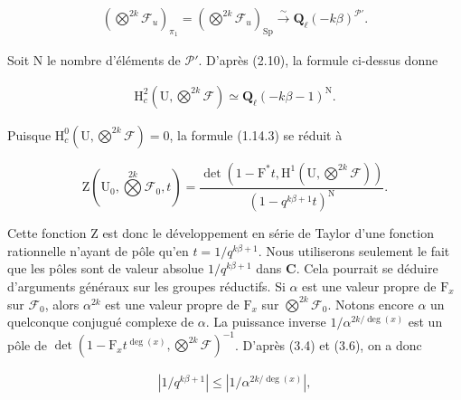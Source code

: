 \documentclass[10pt,leqno]{article}
\begin{document}
\begin{equation*}\begin{gathered}(\bigotimes\limits^{2k}\mathcal{F} _{u})_{\pi _{1}} = (\bigotimes\limits^{2k}\mathcal{F} _{u})_{\operatorname{Sp}} \xrightarrow{\sim } \mathbf{Q}_{\ell }(- k\beta )^{\mathcal{P} '}.\end{gathered}\end{equation*}

\noindent Soit \(\mathrm{N}\) le nombre d’éléments de \(\mathcal{P} '\). D’après (2.10), la formule ci-dessus donne\par

\begin{equation*}\begin{gathered}\mathrm{H}_{c}^{2}(\mathrm{U},\bigotimes\limits^{2k}\mathcal{F} ) \simeq  \mathbf{Q}_{\ell }(- k\beta - 1)^{\mathrm{N}}.\end{gathered}\end{equation*}

\noindent Puisque \(\mathrm{H}_{c}^{0}(\mathrm{U},\bigotimes\limits^{2k}\mathcal{F} )=0\), la formule (1.14.3) se réduit à\par

\[\mathrm{Z}(\mathrm{U}_{0},\bigotimes\limits^{2k}\mathcal{F} _{0},t)=\frac{\operatorname{det}(1- \mathrm{F}^{*}t,\mathrm{H}^{1}(\mathrm{U},\bigotimes\limits^{2k}\mathcal{F} ))}{(1- q^{k\beta +1}t)^{\mathrm{N}}}.\]

\noindent Cette fonction \(\mathrm{Z}\) est donc le développement en série de Taylor d’une fonction rationnelle n’ayant de pôle qu’en \(t=1/q^{k\beta +1}\). Nous utiliserons seulement le fait que les pôles sont de valeur absolue \(1/q^{k\beta +1}\) dans \(\mathbf{C}\). Cela pourrait se déduire d’arguments généraux sur les groupes réductifs. Si \(\alpha \) est une valeur propre de \(\mathrm{F}_{x}\) sur \(\mathcal{F} _{0}\), alors \(\alpha ^{2k}\) est une valeur propre de \(\mathrm{F}_{x}\) sur \(\bigotimes\limits^{2k}\mathcal{F} _{0}\). Notons encore \(\alpha \) un quelconque conjugué complexe de \(\alpha \). La puissance inverse \(1/\alpha ^{2k/\operatorname{deg}(x)}\) est un pôle de \(\operatorname{det}(1- \mathrm{F}_{x} t^{\operatorname{deg}(x)},\bigotimes\limits^{2k}\mathcal{F} )^{- 1}\). D’après (3.4) et (3.6), on a donc\par

\begin{equation*}\begin{gathered}|1/q^{k\beta +1}| \leq  |1/\alpha ^{2k/\operatorname{deg}(x)}|,\end{gathered}\end{equation*}
\end{document}
